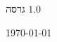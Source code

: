 
\begin{center}
\begin{bfseries}
\bigskip
\bigskip
גרסה
$1.0$

\bigskip

\today

\end{bfseries}
\end{center}
